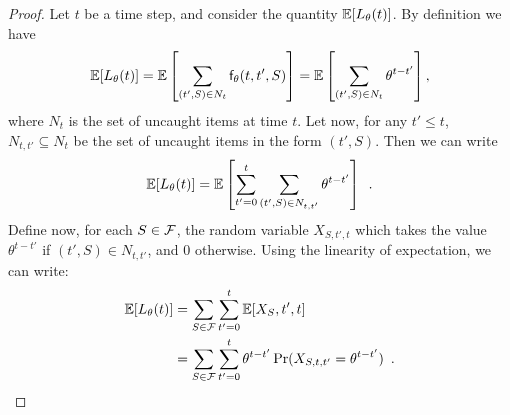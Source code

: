 \begin{proof}
	Let $t$ be a time step, and consider the quantity $\mathbb{E}[L_\theta(t)]$. By
	definition we have
	\[
		\mathbb{E}[L_\theta(t)]=\mathbb{E}\left[\sum_{(t',S)\in
		N_t}\mathsf{f}_\theta(t,t',S)\right]=\mathbb{E}\left[\sum_{(t',S)\in
		N_t}\theta^{t-t'}\right],
	\]
	where $N_t$ is the set of uncaught items at time $t$. Let now, for any
	$t'\le t$, $N_{t,t'}\subseteq N_t$ be the set of uncaught items in the form
	$(t',S)$. Then we can write
	\[
		\mathbb{E}[L_\theta(t)]=\mathbb{E}\left[\sum_{t'=0}^{t}\sum_{(t',S)\in
			N_{t,t'}}\theta^{t-t'}\right]\enspace.
	\]
	Define now, for each $S\in\mathcal{F}$, the random variable $X_{S,t',t}$ which
	takes the value $\theta^{t-t'}$ if $(t',S)\in N_{t,t'}$, and $0$ otherwise.
	Using the linearity of expectation, we can write:
	\begin{align}\label{eq:loadexp}
		\mathbb{E}[L_\theta(t)]&=\sum_{S\in\mathcal{F}}\sum_{t'=0}^t\mathbb{E}[X_S,t',t]\nonumber\\
		&=\sum_{S\in\mathcal{F}}\sum_{t'=0}^t
		\theta^{t-t'}\Pr(X_{S,t,t'}=\theta^{t-t'})\enspace.
	\end{align}


\end{proof}
